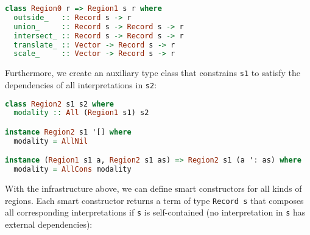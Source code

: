 \begin{lstlisting}[language=Haskell]
class Region0 r => Region1 s r where
  outside_   :: Record s -> r
  union_     :: Record s -> Record s -> r
  intersect_ :: Record s -> Record s -> r
  translate_ :: Vector -> Record s -> r
  scale_     :: Vector -> Record s -> r
\end{lstlisting}
\noindent
Furthermore, we create an auxiliary type class that constrains
\lstinline!s1! to satisfy the dependencies of all
interpretations in \lstinline!s2!:

\begin{lstlisting}[language=Haskell]
class Region2 s1 s2 where
  modality :: All (Region1 s1) s2

instance Region2 s1 '[] where
  modality = AllNil

instance (Region1 s1 a, Region2 s1 as) => Region2 s1 (a ': as) where
  modality = AllCons modality
\end{lstlisting}
\noindent
With the infrastructure above, we can define smart constructors for all
kinds of regions. Each smart constructor returns a term of type
\lstinline!Record s! that composes all corresponding
interpretations if \lstinline!s! is self-contained (no
interpretation in \lstinline!s! has external
dependencies):

